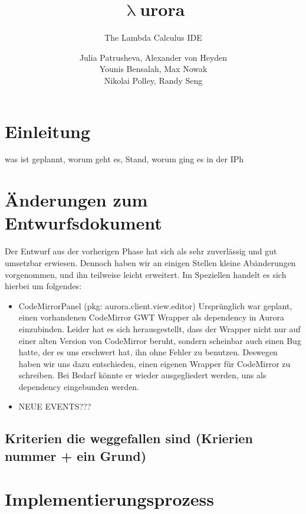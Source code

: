 \documentclass[parskip=full,11pt,twoside]{scrartcl}
\title{\textbf{$\uplambda$}urora}
\subtitle{The Lambda Calculus IDE}
\author{Julia Patrusheva, Alexander von Heyden\\
Younis Bensalah, Max Nowak\\
Nikolai Polley, Randy Seng}
\begin{document}
\maketitle
\tableofcontents
\section{Einleitung}
was ist geplannt, worum geht es, Stand, worum ging es in der IPh
\pagebreak

\section{Änderungen zum Entwurfsdokument}
Der Entwurf aus der vorherigen Phase hat sich als sehr zuverlässig und gut umsetzbar erwiesen.
Dennoch haben wir an einigen Stellen kleine Abänderungen vorgenommen, und ihn teilweise leicht erweitert.
Im Speziellen handelt es sich hierbei um folgendes:
\begin{itemize}
    \item CodeMirrorPanel (pkg: aurora.client.view.editor)
    \newline
    Ursprünglich war geplant, einen vorhandenen CodeMirror GWT Wrapper als dependency in Aurora einzubinden.
    Leider hat es sich herausgestellt, dass der Wrapper nicht nur auf einer alten Version von CodeMirror beruht, sondern scheinbar auch einen Bug hatte, der es uns erschwert hat, ihn ohne Fehler zu benutzen.
    Deswegen haben wir uns dazu entschieden, einen eigenen Wrapper für CodeMirror zu schreiben.
    Bei Bedarf könnte er wieder ausgegliedert werden, uns als dependency eingebunden werden.

    \item NEUE EVENTS???
\end{itemize}
\subsection{Kriterien die weggefallen sind (Krierien nummer + ein Grund)}
\pagebreak

\section{Implementierungsprozess}
\end{document}

